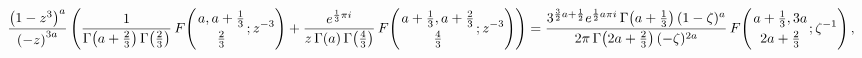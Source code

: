 \[\frac{\left(1-z^{3}\right)^{a}}{\left(-z\right)^{3a}}\left(\frac{1}{\mathop{%
\Gamma\/}\nolimits\!\left(a+\frac{2}{3}\right)\mathop{\Gamma\/}\nolimits\!%
\left(\frac{2}{3}\right)}\mathop{F\/}\nolimits\!\left({a,a+\frac{1}{3}\atop%
\frac{2}{3}};z^{-3}\right)+\frac{e^{\frac{1}{3}\pi i}}{z\mathop{\Gamma\/}%
\nolimits\!\left(a\right)\mathop{\Gamma\/}\nolimits\!\left(\frac{4}{3}\right)}%
\mathop{F\/}\nolimits\!\left({a+\frac{1}{3},a+\frac{2}{3}\atop\frac{4}{3}};z^{%
-3}\right)\right)=\frac{3^{\frac{3}{2}a+\frac{1}{2}}e^{\frac{1}{2}a\pi i}%
\mathop{\Gamma\/}\nolimits\!\left(a+\frac{1}{3}\right)(1-\zeta)^{a}}{2\pi%
\mathop{\Gamma\/}\nolimits\!\left(2a+\frac{2}{3}\right)(-\zeta)^{2a}}\mathop{F%
\/}\nolimits\!\left({a+\frac{1}{3},3a\atop 2a+\frac{2}{3}};\zeta^{-1}\right),\]